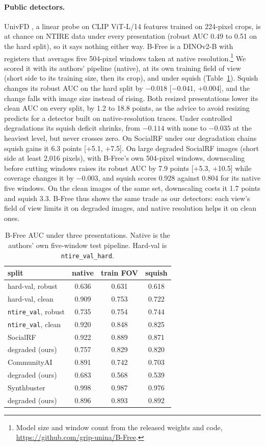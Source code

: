 \documentclass[letterpaper]{article} %
\begin{document}
\paragraph{Public detectors.} UnivFD \cite{ojha2023univfd}, a linear probe on
CLIP ViT-L/14 features trained on 224-pixel crops, is at chance on NTIRE data
under every presentation (robust AUC 0.49 to 0.51 on the hard split), so it
says nothing either way. B-Free \cite{guillaro2025bfree} is a DINOv2-B with
registers that averages five 504-pixel windows taken at native
resolution.\footnote{Model size and window count from the released weights
and code, \url{https://github.com/grip-unina/B-Free}.} We scored it with its
authors' pipeline (native), at its own training field of view (short side to
its training size, then its crop), and under squish (Table~\ref{tab:public}).
Squish changes its robust AUC on the hard split by $-0.018$ [$-0.041$,
+0.004], and the change falls with image size instead of rising. Both resized
presentations lower its clean AUC on every split, by 1.2 to 18.8 points, as
the advice to avoid resizing predicts for a detector built on
native-resolution traces. Under controlled degradations its squish deficit
shrinks, from $-0.114$ with none to $-0.035$ at the heaviest level, but never
crosses zero. On SocialRF under our degradation chains squish gains it 6.3
points [+5.1, +7.5]. On large degraded SocialRF images (short side at least 2,016
pixels), with B-Free's own 504-pixel windows, downscaling before cutting
windows raises its robust AUC by 7.9 points [+5.3, +10.5] while coverage
changes it by $-0.003$, and squish scores 0.928 against 0.804 for its native
five windows. On the clean images of the same set, downscaling costs it 1.7
points and squish 3.3. B-Free thus shows the same trade as our detectors:
each view's field of view limits it on degraded images, and native
resolution helps it on clean ones.

\begin{table}[t]
\centering
\small
\setlength{\tabcolsep}{4pt}
\begin{tabular}{lccc}
\toprule
split & native & train FOV & squish \\
\midrule
hard-val, robust & 0.636 & 0.631 & 0.618 \\
hard-val, clean & 0.909 & 0.753 & 0.722 \\
\texttt{ntire\_val}, robust & 0.735 & 0.754 & 0.744 \\
\texttt{ntire\_val}, clean & 0.920 & 0.848 & 0.825 \\
\midrule
SocialRF & 0.922 & 0.889 & 0.871 \\
\quad degraded (ours) & 0.757 & 0.829 & 0.820 \\
CommunityAI & 0.891 & 0.742 & 0.703 \\
\quad degraded (ours) & 0.683 & 0.568 & 0.539 \\
Synthbuster & 0.998 & 0.987 & 0.976 \\
\quad degraded (ours) & 0.896 & 0.893 & 0.892 \\
\bottomrule
\end{tabular}
\caption{B-Free AUC under three presentations. Native is the authors' own
five-window test pipeline. Hard-val is \texttt{ntire\_val\_hard}.}
\label{tab:public}
\end{table}
\end{document}
